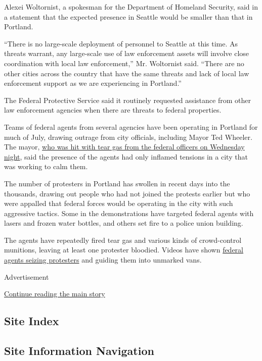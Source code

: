 Alexei Woltornist, a spokesman for the Department of Homeland Security,
said in a statement that the expected presence in Seattle would be
smaller than that in Portland.

``There is no large-scale deployment of personnel to Seattle at this
time. As threats warrant, any large-scale use of law enforcement assets
will involve close coordination with local law enforcement,'' Mr.
Woltornist said. ``There are no other cities across the country that
have the same threats and lack of local law enforcement support as we
are experiencing in Portland.''

The Federal Protective Service said it routinely requested assistance
from other law enforcement agencies when there are threats to federal
properties.

Teams of federal agents from several agencies have been operating in
Portland for much of July, drawing outrage from city officials,
including Mayor Ted Wheeler. The mayor,
\href{https://www.nytimes.com/2020/07/23/us/portland-protest-tear-gas-mayor.html}{who
was hit with tear gas from the federal officers on Wednesday night},
said the presence of the agents had only inflamed tensions in a city
that was working to calm them.

The number of protesters in Portland has swollen in recent days into the
thousands, drawing out people who had not joined the protests earlier
but who were appalled that federal forces would be operating in the city
with such aggressive tactics. Some in the demonstrations have targeted
federal agents with lasers and frozen water bottles, and others set fire
to a police union building.

The agents have repeatedly fired tear gas and various kinds of
crowd-control munitions, leaving at least one protester bloodied. Videos
have shown
\href{https://www.nytimes.com/2020/07/17/us/portland-protests.html}{federal
agents seizing protesters} and guiding them into unmarked vans.

Advertisement

\protect\hyperlink{after-bottom}{Continue reading the main story}

\hypertarget{site-index}{%
\subsection{Site Index}\label{site-index}}

\hypertarget{site-information-navigation}{%
\subsection{Site Information
Navigation}\label{site-information-navigation}}

